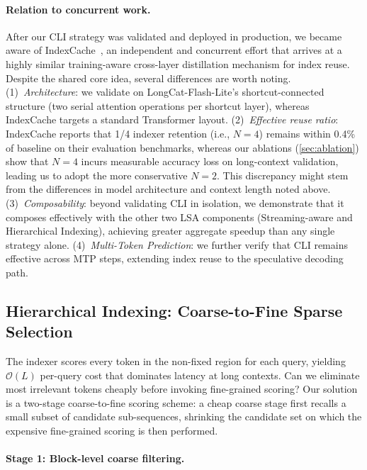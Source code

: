 \documentclass{article}
\newcommand{\longcat}{LongCat-Flash-Lite\xspace}
\begin{document}
\paragraph{Relation to concurrent work.}
After our CLI strategy was validated and deployed in production, we became aware of IndexCache~\citep{bai2026indexcache}, an independent and concurrent effort that arrives at a highly similar training-aware cross-layer distillation mechanism for index reuse. 
Despite the shared core idea, several differences are worth noting.
(1)~\emph{Architecture}: we validate on \longcat's shortcut-connected structure (two serial attention operations per shortcut layer), whereas IndexCache targets a standard Transformer layout.
(2)~\emph{Effective reuse ratio}: IndexCache reports that 1/4 indexer retention (i.e., $N{=}4$) remains within 0.4\% of baseline on their evaluation benchmarks, whereas our ablations (\cref{sec:ablation}) show that $N{=}4$ incurs measurable accuracy loss on long-context validation, leading us to adopt the more conservative $N{=}2$. This discrepancy might stem from the differences in model architecture and context length noted above.
(3)~\emph{Composability}: beyond validating CLI in isolation, we demonstrate that it composes effectively with the other two LSA components (Streaming-aware and Hierarchical Indexing), achieving greater aggregate speedup than any single strategy alone.
(4)~\emph{Multi-Token Prediction}: we further verify that CLI remains effective across MTP steps, extending index reuse to the speculative decoding path.

\subsection{Hierarchical Indexing: Coarse-to-Fine Sparse Selection}
\label{sec:hierarchical}

The indexer scores every token in the non-fixed region for each query, yielding $\mathcal{O}(L)$ per-query cost that dominates latency at long contexts. Can we eliminate most irrelevant tokens cheaply before invoking fine-grained scoring? Our solution is a two-stage coarse-to-fine scoring scheme: a cheap coarse stage first recalls a small subset of candidate sub-sequences, shrinking the candidate set on which the expensive fine-grained scoring is then performed.

\paragraph{Stage 1: Block-level coarse filtering.}
\end{document}
